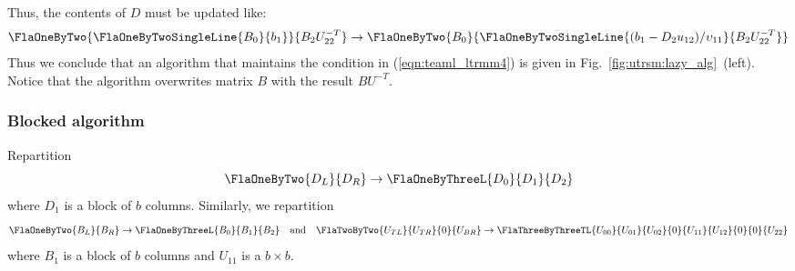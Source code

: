 Thus, the contents of $ D $ must be updated like:
\[
\FlaOneByTwo{ \FlaOneByTwoSingleLine{ B_{0} }
                                    { b_{1} } }
	    { B_{2} U_{22}^{-T}  } \\ 
\rightarrow
\FlaOneByTwo { 
	       B_{0} }
             { 
               \FlaOneByTwoSingleLine { ( b_{1} - D_{2} u_{12} ) / \upsilon_{11} } { B_{2} U_{22}^{-T} }
              } \\
\]
Thus we conclude that
an algorithm that maintains the condition in (\ref{eqn:teaml_ltrmm4}) is
given in Fig.~\ref{fig:utrsm:lazy_alg}~(left).
Notice that the algorithm overwrites matrix $ B $ with the
result $ B U^{-T} $.

\subsubsection{Blocked algorithm}

Repartition
\[
  \FlaOneByTwo{ D_{L} }
              { D_{R} } \rightarrow
  \FlaOneByThreeL{ D_{0} }
                 { D_{1} }
                 { D_{2} }
\]
where
$ D_{1} $ is a block of $ b $ columns.
Similarly, we repartition 
\[ 
  \FlaOneByTwo{ B_{L} }
              { B_{R} } \rightarrow
  \FlaOneByThreeL{ B_{0} }
                 { B_{1} }
                 { B_{2} }
\quad \mbox{and} \quad
      \FlaTwoByTwo{ U_{TL} }{ U_{TR} }
                  {   0    }{ U_{BR} } \rightarrow
      \FlaThreeByThreeTL{ U_{00} } { U_{01} }  { U_{02} }
                        {   0    } { U_{11} }  { U_{12} }
                        {   0    } {   0    }  { U_{22} }  
\]
where $ B_{1} $ is a block of $ b $ columns and 
$ U_{11} $ is a $ b \times b $.

